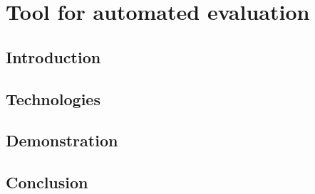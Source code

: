 \chapter{Tool for automated evaluation}
\label{cha:tool}

\section{Introduction}
\label{sec:tool-introduction}

\section{Technologies}
\label{sec:tool-technologies}

\section{Demonstration}
\label{sec:tool-demonstration}

\section{Conclusion}
\label{sec:tool-conclusion}

